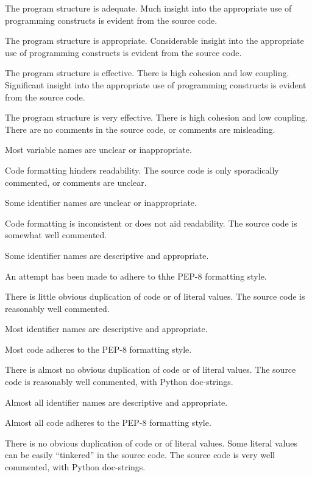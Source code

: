\documentclass{../../fal_assignment}
\begin{document}
\begin{markingrubric}
	\par The program structure is adequate.
	\grade Much insight into the appropriate use of programming constructs is evident from the source code.
	\par The program structure is appropriate.
	\grade Considerable insight into the appropriate use of programming constructs is evident from the source code.
	\par The program structure is effective. There is high cohesion and low coupling.
	\grade Significant insight into the appropriate use of programming constructs is evident from the source code.
	\par The program structure is very effective. There is high cohesion and low coupling.
	\grade\fail There are no comments in the source code, or comments are misleading.
	\par Most variable names are unclear or inappropriate.
	\par Code formatting hinders readability.
	\grade The source code is only sporadically commented, or comments are unclear.
	\par Some identifier names are unclear or inappropriate.
	\par Code formatting is inconsistent or does not aid readability.
	\grade The source code is somewhat well commented.
	\par Some identifier names are descriptive and appropriate.
	\par An attempt has been made to adhere to thhe PEP-8 formatting style.
	\par There is little obvious duplication of code or of literal values.           
	\grade The source code is reasonably well commented.
	\par Most identifier names are descriptive and appropriate.
	\par Most code adheres to the PEP-8 formatting style.
	\par There is almost no obvious duplication of code or of literal values.   
	\grade The source code is reasonably well commented, with Python doc-strings.
	\par Almost all identifier names are descriptive and appropriate.
	\par Almost all code adheres to the PEP-8 formatting style.
	\par There is no obvious duplication of code or of literal values. Some literal values can be easily ``tinkered'' in the source code. 
	\grade The source code is very well commented, with Python doc-strings.

\end{markingrubric}
\end{document}
